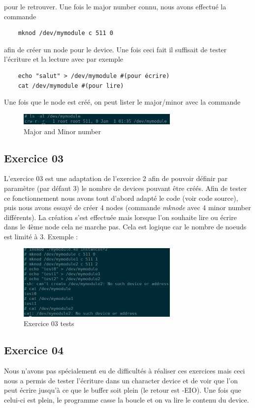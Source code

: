 \documentclass{ReportTemplate}
\begin{document}
pour le retrouver. Une fois le major number connu, nous avons effectué la
commande
\begin{verbatim}
    mknod /dev/mymodule c 511 0
\end{verbatim}
afin de créer un node pour le device. Une fois ceci fait il suffisait de tester
l'écriture et la lecture avec par exemple
\begin{verbatim}
    echo "salut" > /dev/mymodule #(pour écrire)
    cat /dev/mymodule #(pour lire)
\end{verbatim} 
Une fois que le node est créé, on peut lister le major/minor avec la commande 
\begin{figure}[H]
    \centering
    \includegraphics[width=0.7\textwidth]{imageSources/MajorMinor.png}
    \caption{Major and Minor number}
    \label{fig:MajorMinor}
\end{figure}
\newpage
\subsection{Exercice 03}
L'exercice 03 est une adaptation de l'exercice 2 afin de pouvoir définir par
paramètre (par défaut 3) le nombre de devices pouvant être créés. Afin de tester
ce fonctionnement nous avons tout d'abord adapté le code (voir code source),
puis nous avons essayé de créer 4 nodes (commande \textit{mknode} avec 4 minor
number différents). La création s'est effectuée mais lorsque l'on souhaite lire
ou écrire dans le 4ème node cela ne marche pas. Cela est logique car le nombre
de noeuds est limité à 3. Exemple :
\begin{figure}[H]
    \centering
    \includegraphics[width=0.7\textwidth]{imageSources/Ex3_cDev.png}
    \caption{Exercice 03 tests}
    \label{fig:Ex3Tests}
\end{figure}
\subsection{Exercice 04}
Nous n'avons pas spécialement eu de difficultés à réaliser ces exercices mais
ceci nous a permis de tester l'écriture dans un character device et de voir que
l'on peut écrire jusqu'à ce que le buffer soit plein (le retour est -EIO). Une
fois que celui-ci est plein, le programme casse la boucle et on va lire le
contenu du device.
\end{document}
